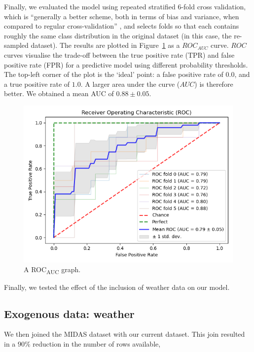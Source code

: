 \documentclass[12pt,a4paper]{article}
\begin{document}
Finally, we evaluated the model using repeated stratified $6$-fold cross validation, which is “generally a better scheme, both in terms of bias and variance, when compared to regular cross-validation” \cite{kohavi_1995}, and selects folds so that each contains roughly the same class distribution in the original dataset (in this case, the re-sampled dataset). The results are plotted in Figure~\ref{fig:roc} as a $ROC_{AUC}$ curve. $ROC$ curves visualise the trade-off between the true positive rate (TPR) and false positive rate (FPR) for a predictive model using different probability thresholds. The top-left corner of the plot is the ‘ideal’ point: a false positive rate of $0.0$, and a true positive rate of $1.0$. A larger area under the curve ($AUC$) is therefore better. We obtained a mean AUC of $0.88 \pm 0.05$. 

\begin{figure}[h!]
  \includegraphics[width=\linewidth]{images/roc_auc.png}
  \caption{A ROC\textsubscript{AUC} graph.}
  \label{fig:roc}
\end{figure}

Finally, we tested the effect of the inclusion of weather data on our model. 

\subsection{Exogenous data: weather}

We then joined the MIDAS dataset with our current dataset. This join resulted in a $90\%$ reduction in the number of rows available, 
\end{document}
